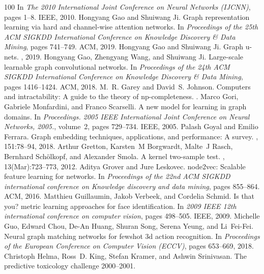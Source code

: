\begin{thebibliography}{100}
\newblock In {\em The 2010 International Joint Conference on Neural Networks
  (IJCNN)}, pages 1--8. IEEE, 2010.
Hongyang Gao and Shuiwang Ji.
\newblock Graph representation learning via hard and channel-wise attention
  networks.
\newblock In {\em Proceedings of the 25th ACM SIGKDD International Conference
  on Knowledge Discovery \& Data Mining}, pages 741--749. ACM, 2019.
Hongyang Gao and Shuiwang Ji.
\newblock Graph u-nets.
, 2019.
Hongyang Gao, Zhengyang Wang, and Shuiwang Ji.
\newblock Large-scale learnable graph convolutional networks.
\newblock In {\em Proceedings of the 24th ACM SIGKDD International Conference
  on Knowledge Discovery \& Data Mining}, pages 1416--1424. ACM, 2018.
M.~R. Garey and David~S. Johnson.
\newblock Computers and intractability: A guide to the theory of
  np-completeness.
.
Marco Gori, Gabriele Monfardini, and Franco Scarselli.
\newblock A new model for learning in graph domains.
\newblock In {\em Proceedings. 2005 IEEE International Joint Conference on
  Neural Networks, 2005.}, volume~2, pages 729--734. IEEE, 2005.
Palash Goyal and Emilio Ferrara.
\newblock Graph embedding techniques, applications, and performance: A survey.
, 151:78--94, 2018.
Arthur Gretton, Karsten~M Borgwardt, Malte~J Rasch, Bernhard Sch{\"o}lkopf, and
  Alexander Smola.
\newblock A kernel two-sample test.
, 13(Mar):723--773, 2012.
Aditya Grover and Jure Leskovec.
\newblock node2vec: Scalable feature learning for networks.
\newblock In {\em Proceedings of the 22nd ACM SIGKDD international conference
  on Knowledge discovery and data mining}, pages 855--864. ACM, 2016.
Matthieu Guillaumin, Jakob Verbeek, and Cordelia Schmid.
\newblock Is that you? metric learning approaches for face identification.
\newblock In {\em 2009 IEEE 12th international conference on computer vision},
  pages 498--505. IEEE, 2009.
Michelle Guo, Edward Chou, De-An Huang, Shuran Song, Serena Yeung, and
  Li~Fei-Fei.
\newblock Neural graph matching networks for fewshot 3d action recognition.
\newblock In {\em Proceedings of the European Conference on Computer Vision
  (ECCV)}, pages 653--669, 2018.
Christoph Helma, Ross~D. King, Stefan Kramer, and Ashwin Srinivasan.
\newblock The predictive toxicology challenge 2000--2001.

\end{thebibliography}
